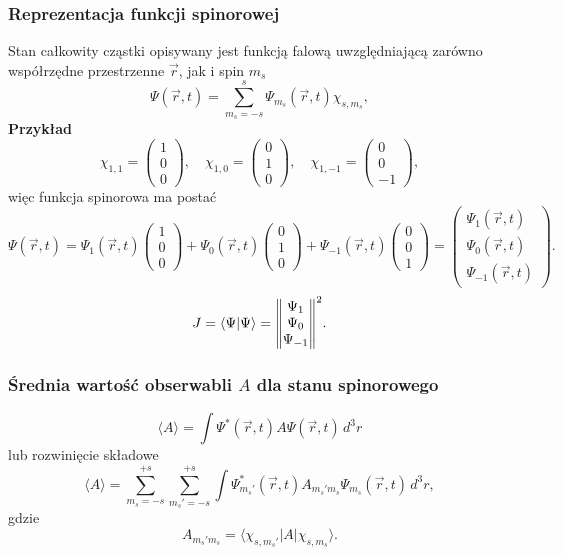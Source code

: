 \subsubsection*{Reprezentacja funkcji spinorowej}
Stan całkowity cząstki opisywany jest funkcją falową uwzględniającą zarówno współrzędne przestrzenne $\vec{r}$, jak i spin $m_s$
$$
\Psi(\vec{r}, t) = \sum_{m_s = -s}^{s} \Psi_{m_s}(\vec{r}, t) \chi_{s, m_s},
$$
\textbf{Przykład}
$$
\chi_{1, 1} = \begin{pmatrix} 1 \\ 0 \\ 0 \end{pmatrix}, \quad
\chi_{1, 0} = \begin{pmatrix} 0 \\ 1 \\ 0 \end{pmatrix}, \quad
\chi_{1, -1} = \begin{pmatrix} 0 \\ 0 \\ -1 \end{pmatrix},
$$
więc funkcja spinorowa ma postać
$$
\Psi(\vec{r}, t) = \Psi_{1}(\vec{r}, t) \begin{pmatrix} 1 \\ 0 \\ 0 \end{pmatrix}
+ \Psi_{0}(\vec{r}, t) \begin{pmatrix} 0 \\ 1 \\ 0 \end{pmatrix}
+ \Psi_{-1}(\vec{r}, t) \begin{pmatrix} 0 \\ 0 \\ 1 \end{pmatrix}
= \begin{pmatrix}
\Psi_1(\vec{r}, t) \\
\Psi_0(\vec{r}, t) \\
\Psi_{-1}(\vec{r}, t)
\end{pmatrix}.
$$
$$
J=\langle \Psi | \Psi \rangle = \norm{\begin{matrix}
\Psi_1 \\
\Psi_0 \\
\Psi_{-1}
\end{matrix}}^2.
$$

\subsubsection*{Średnia wartość obserwabli $A$ dla stanu spinorowego}
$$
\langle A \rangle = \int \Psi^*(\vec{r}, t) A \Psi(\vec{r}, t) \, d^3r
$$
lub rozwinięcie składowe
$$
\langle A \rangle = \sum_{m_s=-s}^{+s} \sum_{m_s'=-s}^{+s} \int \Psi_{m_s'}^*(\vec{r}, t) A_{m_s' m_s} \Psi_{m_s}(\vec{r}, t) \, d^3r,
$$
gdzie
$$
A_{m_s' m_s} = \langle \chi_{s, m_s'} | A | \chi_{s, m_s} \rangle.
$$
